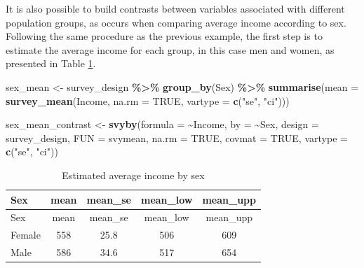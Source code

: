\documentclass[
  english,
  12pt,
]{book}
\newenvironment{Shaded}{\begin{snugshade}}{\end{snugshade}}
\newcommand{\AttributeTok}[1]{\textcolor[rgb]{0.13,0.29,0.53}{#1}}
\newcommand{\ConstantTok}[1]{\textcolor[rgb]{0.56,0.35,0.01}{#1}}
\newcommand{\FunctionTok}[1]{\textcolor[rgb]{0.13,0.29,0.53}{\textbf{#1}}}
\newcommand{\NormalTok}[1]{#1}
\newcommand{\OtherTok}[1]{\textcolor[rgb]{0.56,0.35,0.01}{#1}}
\newcommand{\SpecialCharTok}[1]{\textcolor[rgb]{0.81,0.36,0.00}{\textbf{#1}}}
\newcommand{\StringTok}[1]{\textcolor[rgb]{0.31,0.60,0.02}{#1}}
\begin{document}
It is also possible to build contrasts between variables associated with different population groups, as occurs when comparing average income according to sex. Following the same procedure as the previous example, the first step is to estimate the average income for each group, in this case men and women, as presented in Table \ref{tab:tab-prom-sexo}.

\begin{Shaded}
\begin{Highlighting}[]
\NormalTok{sex\_mean }\OtherTok{\textless{}{-}}\NormalTok{ survey\_design }\SpecialCharTok{\%\textgreater{}\%}
  \FunctionTok{group\_by}\NormalTok{(Sex) }\SpecialCharTok{\%\textgreater{}\%}
  \FunctionTok{summarise}\NormalTok{(}\AttributeTok{mean =} \FunctionTok{survey\_mean}\NormalTok{(Income,}
                               \AttributeTok{na.rm =} \ConstantTok{TRUE}\NormalTok{,}
                               \AttributeTok{vartype =} \FunctionTok{c}\NormalTok{(}\StringTok{"se"}\NormalTok{, }\StringTok{"ci"}\NormalTok{)))}

\NormalTok{sex\_mean\_contrast }\OtherTok{\textless{}{-}} \FunctionTok{svyby}\NormalTok{(}\AttributeTok{formula =} \SpecialCharTok{\textasciitilde{}}\NormalTok{Income,}
                           \AttributeTok{by =} \SpecialCharTok{\textasciitilde{}}\NormalTok{Sex,}
                           \AttributeTok{design =}\NormalTok{ survey\_design,}
                           \AttributeTok{FUN =}\NormalTok{ svymean,}
                           \AttributeTok{na.rm =} \ConstantTok{TRUE}\NormalTok{,}
                           \AttributeTok{covmat =} \ConstantTok{TRUE}\NormalTok{,}
                           \AttributeTok{vartype =} \FunctionTok{c}\NormalTok{(}\StringTok{"se"}\NormalTok{, }\StringTok{"ci"}\NormalTok{))}
\end{Highlighting}
\end{Shaded}

\begin{longtable}[]{@{}lcccc@{}}
\caption{\label{tab:tab-prom-sexo}Estimated average income by sex}\tabularnewline
\toprule\noalign{}
Sex & mean & mean\_se & mean\_low & mean\_upp \\
\midrule\noalign{}
\endfirsthead
\toprule\noalign{}
Sex & mean & mean\_se & mean\_low & mean\_upp \\
\midrule\noalign{}
\endhead
\bottomrule\noalign{}
\endlastfoot
Female & 558 & 25.8 & 506 & 609 \\
Male & 586 & 34.6 & 517 & 654 \\
\end{longtable}
\end{document}
